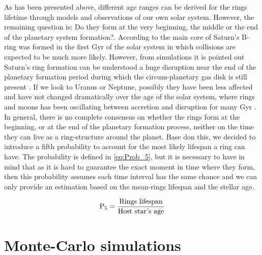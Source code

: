 As has been presented above, different age ranges can be derived for the rings lifetime through models and observations of our own solar system. However, the remaining question is: Do they form at the very beginning, the middle or the end of the planetary system formation?. According to \citeyear{2009Icar..199..413C} the main core of Saturn's B-ring was formed in the first Gyr of the solar system in which collisions are expected to be much more likely. However, from simulations it is pointed out Saturn's ring formation can be understood a huge disruption near the end of the planetary formation period during which the circum-planetary gas disk is still present \citeyear{2010Natur.468..943C}. If we look to Uranus or Neptune, possibly they have been less affected and have not changed dramatically over the age of the solar system, where rings and moons has been oscillating between accretion and disruption for many Gyr \citeyear{2013pss3.book..309T}.\\

In general, there is no complete consensus on whether the rings form at the beginning, or at the end of the planetary formation process, neither on the time they can live as a ring-structure around the planet. Base don this, we decided to introduce a fifth probability to account for the most likely lifespan a ring can have. The probability is defined in \autoref{eq:Prob_5}, but it is necessary to have in mind that as it is hard to guarantee the exact moment in time where they form, then this probability assumes each time interval has the same chance and we can only provide an estimation based on the mean-rings lifespan and the stellar age.  

\begingroup
\Large
\begin{equation}
\textnormal{P}_5 = \frac{\textnormal{Rings}~\textnormal{lifespan}}{\textnormal{Host}~\textnormal{star's}~\textnormal{age}}
 \label{eq:Prob_5}
\end{equation}
\endgroup


\section{Monte-Carlo simulations}\label{sec:MCSec}

